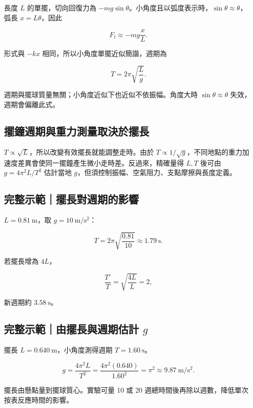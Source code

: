 \documentclass[11pt,a4paper]{article}
\begin{document}
長度 \(L\) 的單擺，切向回復力為 \(-mg\sin\theta\)。小角度且以弧度表示時，\(\sin\theta\approx\theta\)，弧長 \(x=L\theta\)，因此

\[
F_t\approx-mg\frac{x}{L}.
\]

形式與 \(-kx\) 相同，所以小角度單擺近似簡諧，週期為

\[
\boxed{T=2\pi\sqrt{\frac{L}{g}}}.
\]

週期與擺球質量無關；小角度近似下也近似不依振幅。角度大時 \(\sin\theta\approx\theta\) 失效，週期會偏離此式。

\subsection{擺鐘週期與重力測量取決於擺長}\label{ux64faux9418ux9031ux671fux8207ux91cdux529bux6e2cux91cfux53d6ux6c7aux65bcux64faux9577}

\(T\propto\sqrt L\)，所以改變有效擺長就能調整走時。由於 \(T\propto1/\sqrt g\)，不同地點的重力加速度差異會使同一擺鐘產生微小走時差。反過來，精確量得 \(L,T\) 後可由 \(g=4\pi^2L/T^2\) 估計當地 \(g\)，但須控制振幅、空氣阻力、支點摩擦與長度定義。

\begin{HandoutWorkedExample}

\subsection{完整示範｜擺長對週期的影響}\label{ux5b8cux6574ux793aux7bc4ux64faux9577ux5c0dux9031ux671fux7684ux5f71ux97ff}

\(L=0.81\ \mathrm m\)，取 \(g=10\ \mathrm{m/s^2}\)：

\[
T=2\pi\sqrt{\frac{0.81}{10}}
\approx1.79\ \mathrm s.
\]

若擺長增為 \(4L\)，

\[
\frac{T'}T=\sqrt{\frac{4L}{L}}=2,
\]

新週期約 \(3.58\ \mathrm s\)。

\end{HandoutWorkedExample}

\begin{HandoutWorkedExample}

\subsection{\texorpdfstring{完整示範｜由擺長與週期估計 \(g\)}{完整示範｜由擺長與週期估計 g}}\label{ux5b8cux6574ux793aux7bc4ux7531ux64faux9577ux8207ux9031ux671fux4f30ux8a08-g}

擺長 \(L=0.640\ \mathrm m\)，小角度測得週期 \(T=1.60\ \mathrm s\)。

\[
g=\frac{4\pi^2L}{T^2}
=\frac{4\pi^2(0.640)}{1.60^2}
=\pi^2
\approx9.87\ \mathrm{m/s^2}.
\]

擺長由懸點量到擺球質心。實驗可量 10 或 20 週總時間後再除以週數，降低單次按表反應時間的影響。

\end{HandoutWorkedExample}
\end{document}
